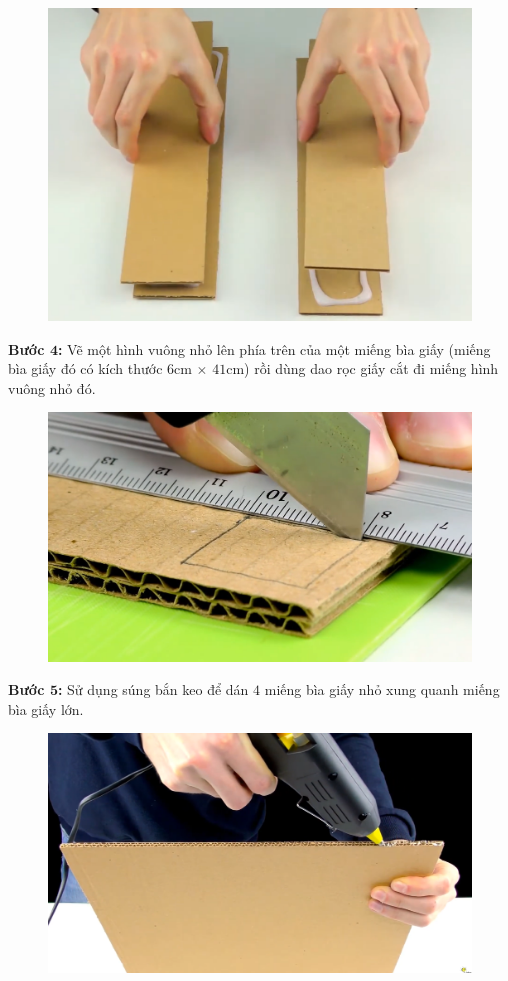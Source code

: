\begin{multicols}{2}
\begin{figure}[H]
		\vspace*{1pt}
		\includegraphics[width= 0.8\linewidth]{5}
		\vspace*{-10pt}
	\end{figure}
	\textbf{\color{toancuabi}Bước $\pmb{4}$:} Vẽ một hình vuông nhỏ lên phía trên của một miếng bìa giấy (miếng bìa giấy đó có kích thước $6$cm $\times$ $41$cm) rồi dùng dao rọc giấy cắt đi miếng hình vuông nhỏ đó. 
	\begin{figure}[H]
		\vspace*{-5pt}
		\centering
		\captionsetup{labelformat= empty, justification=centering}
		\includegraphics[width= 0.8\linewidth]{6}
		\vspace*{-5pt}
	\end{figure}
	\textbf{\color{toancuabi}Bước $\pmb{5}$:} Sử dụng súng bắn keo để dán $4$ miếng bìa giấy nhỏ xung quanh miếng bìa giấy lớn.
	\begin{figure}[H]
		\vspace*{-5pt}
		\centering
		\captionsetup{labelformat= empty, justification=centering}
		\includegraphics[width= 0.8\linewidth]{7}
		

\end{figure}
\end{multicols}
